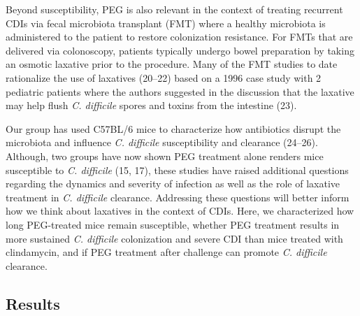 \documentclass[
  11pt,
]{article}
\begin{document}
Beyond susceptibility, PEG is also relevant in the context of treating
recurrent CDIs via fecal microbiota transplant (FMT) where a healthy
microbiota is administered to the patient to restore colonization
resistance. For FMTs that are delivered via colonoscopy, patients
typically undergo bowel preparation by taking an osmotic laxative prior
to the procedure. Many of the FMT studies to date rationalize the use of
laxatives (20--22) based on a 1996 case study with 2 pediatric patients
where the authors suggested in the discussion that the laxative may help
flush \emph{C. difficile} spores and toxins from the intestine (23).

Our group has used C57BL/6 mice to characterize how antibiotics disrupt
the microbiota and influence \emph{C. difficile} susceptibility and
clearance (24--26). Although, two groups have now shown PEG treatment
alone renders mice susceptible to \emph{C. difficile} (15, 17), these
studies have raised additional questions regarding the dynamics and
severity of infection as well as the role of laxative treatment in
\emph{C. difficile} clearance. Addressing these questions will better
inform how we think about laxatives in the context of CDIs. Here, we
characterized how long PEG-treated mice remain susceptible, whether PEG
treatment results in more sustained \emph{C. difficile} colonization and
severe CDI than mice treated with clindamycin, and if PEG treatment
after challenge can promote \emph{C. difficile} clearance.

\hypertarget{results}{%
\subsection{Results}\label{results}}
\end{document}

